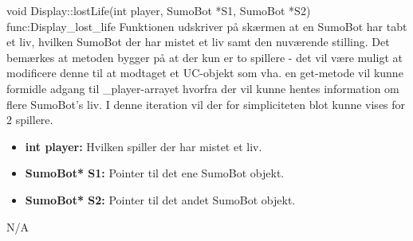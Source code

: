 \begin{functionDescription}
{void Display::lostLife(int player, SumoBot *S1, SumoBot *S2)}
{func:Display_lost_life}
{Funktionen udskriver på skærmen at en SumoBot har tabt et liv, hvilken SumoBot der har mistet et liv samt den nuværende stilling. Det bemærkes at metoden bygger på at der kun er to spillere - det vil være muligt at modificere denne til at modtaget et UC-objekt som vha. en get-metode vil kunne formidle adgang til \_player-arrayet hvorfra der vil kunne hentes information om flere SumoBot's liv. I denne iteration vil der for simpliciteten blot kunne vises for 2 spillere. 
}
{\begin{itemize}
    \item \textbf{int player:} Hvilken spiller der har mistet et liv. 
    \item \textbf{SumoBot* S1:} Pointer til det ene SumoBot objekt.
    \item \textbf{SumoBot* S2:} Pointer til det andet SumoBot objekt. 
\end{itemize}}
{N/A}
\end{functionDescription}



